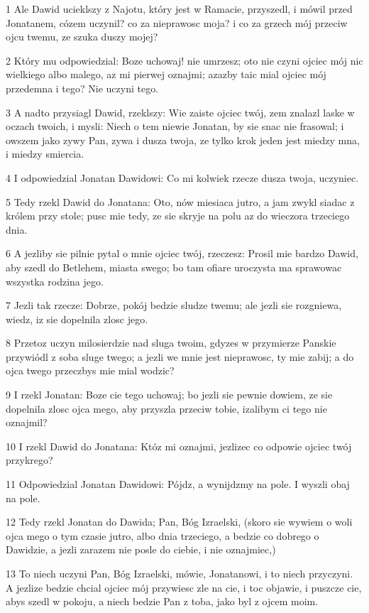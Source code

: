 \par 1 Ale Dawid ucieklszy z Najotu, który jest w Ramacie, przyszedl, i mówil przed Jonatanem, cózem uczynil? co za nieprawosc moja? i co za grzech mój przeciw ojcu twemu, ze szuka duszy mojej?
\par 2 Który mu odpowiedzial: Boze uchowaj! nie umrzesz; oto nie czyni ojciec mój nic wielkiego albo malego, az mi pierwej oznajmi; azazby taic mial ojciec mój przedemna i tego? Nie uczyni tego.
\par 3 A nadto przysiagl Dawid, rzeklszy: Wie zaiste ojciec twój, zem znalazl laske w oczach twoich, i mysli: Niech o tem niewie Jonatan, by sie snac nie frasowal; i owszem jako zywy Pan, zywa i dusza twoja, ze tylko krok jeden jest miedzy mna, i miedzy smiercia.
\par 4 I odpowiedzial Jonatan Dawidowi: Co mi kolwiek rzecze dusza twoja, uczyniec.
\par 5 Tedy rzekl Dawid do Jonatana: Oto, nów miesiaca jutro, a jam zwykl siadac z królem przy stole; pusc mie tedy, ze sie skryje na polu az do wieczora trzeciego dnia.
\par 6 A jezliby sie pilnie pytal o mnie ojciec twój, rzeczesz: Prosil mie bardzo Dawid, aby szedl do Betlehem, miasta swego; bo tam ofiare uroczysta ma sprawowac wszystka rodzina jego.
\par 7 Jezli tak rzecze: Dobrze, pokój bedzie sludze twemu; ale jezli sie rozgniewa, wiedz, iz sie dopelnila zlosc jego.
\par 8 Przetoz uczyn milosierdzie nad sluga twoim, gdyzes w przymierze Panskie przywiódl z soba sluge twego; a jezli we mnie jest nieprawosc, ty mie zabij; a do ojca twego przeczbys mie mial wodzic?
\par 9 I rzekl Jonatan: Boze cie tego uchowaj; bo jezli sie pewnie dowiem, ze sie dopelnila zlosc ojca mego, aby przyszla przeciw tobie, izalibym ci tego nie oznajmil?
\par 10 I rzekl Dawid do Jonatana: Któz mi oznajmi, jezlizec co odpowie ojciec twój przykrego?
\par 11 Odpowiedzial Jonatan Dawidowi: Pójdz, a wynijdzmy na pole. I wyszli obaj na pole.
\par 12 Tedy rzekl Jonatan do Dawida; Pan, Bóg Izraelski, (skoro sie wywiem o woli ojca mego o tym czasie jutro, albo dnia trzeciego, a bedzie co dobrego o Dawidzie, a jezli zarazem nie posle do ciebie, i nie oznajmiec,)
\par 13 To niech uczyni Pan, Bóg Izraelski, mówie, Jonatanowi, i to niech przyczyni. A jezlize bedzie chcial ojciec mój przywiesc zle na cie, i toc objawie, i puszcze cie, abys szedl w pokoju, a niech bedzie Pan z toba, jako byl z ojcem moim.
